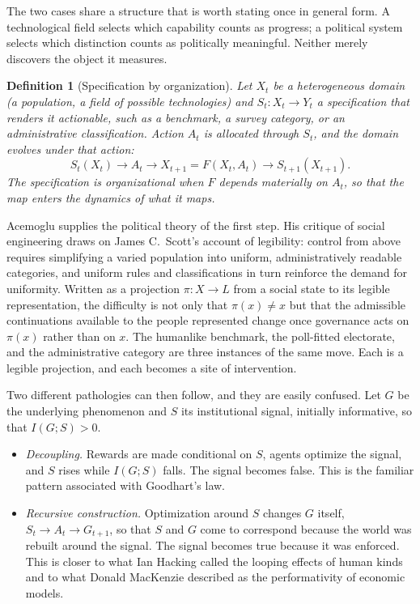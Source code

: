\documentclass[11pt]{article}
\newtheorem{definition}{Definition}
\begin{document}
The two cases share a structure that is worth stating once in general form. A technological field selects which capability counts as progress; a political system selects which distinction counts as politically meaningful. Neither merely discovers the object it measures.

\begin{definition}[Specification by organization]
Let $X_t$ be a heterogeneous domain (a population, a field of possible technologies) and $S_t : X_t \to Y_t$ a specification that renders it actionable, such as a benchmark, a survey category, or an administrative classification. Action $A_t$ is allocated through $S_t$, and the domain evolves under that action:
\[
S_t(X_t) \to A_t \to X_{t+1} = F(X_t, A_t) \to S_{t+1}(X_{t+1}).
\]
The specification is \emph{organizational} when $F$ depends materially on $A_t$, so that the map enters the dynamics of what it maps.
\end{definition}

Acemoglu supplies the political theory of the first step. His critique of social engineering draws on James C.~Scott's account of legibility: control from above requires simplifying a varied population into uniform, administratively readable categories, and uniform rules and classifications in turn reinforce the demand for uniformity. Written as a projection $\pi : X \to L$ from a social state to its legible representation, the difficulty is not only that $\pi(x) \neq x$ but that the admissible continuations available to the people represented change once governance acts on $\pi(x)$ rather than on $x$. The humanlike benchmark, the poll-fitted electorate, and the administrative category are three instances of the same move. Each is a legible projection, and each becomes a site of intervention.

Two different pathologies can then follow, and they are easily confused. Let $G$ be the underlying phenomenon and $S$ its institutional signal, initially informative, so that $I(G;S) > 0$.

\begin{itemize}
\item \emph{Decoupling.} Rewards are made conditional on $S$, agents optimize the signal, and $S$ rises while $I(G;S)$ falls. The signal becomes false. This is the familiar pattern associated with Goodhart's law.
\item \emph{Recursive construction.} Optimization around $S$ changes $G$ itself, $S_t \to A_t \to G_{t+1}$, so that $S$ and $G$ come to correspond because the world was rebuilt around the signal. The signal becomes true because it was enforced. This is closer to what Ian Hacking called the looping effects of human kinds and to what Donald MacKenzie described as the performativity of economic models.
\end{itemize}
\end{document}
